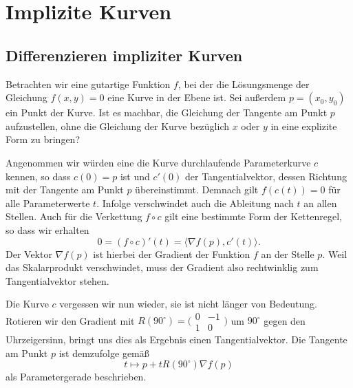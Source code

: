 \section{Implizite Kurven}
\subsection{Differenzieren impliziter Kurven}

Betrachten wir eine gutartige Funktion $f$, bei der die Lösungsmenge
der Gleichung $f(x,y)=0$ eine Kurve in der Ebene ist. Sei außerdem
$p=(x_0,y_0)$ ein Punkt der Kurve. Ist es machbar, die Gleichung
der Tangente am Punkt $p$ aufzustellen, ohne die Gleichung der Kurve
bezüglich $x$ oder $y$ in eine explizite Form zu bringen?

Angenommen wir würden eine die Kurve durchlaufende Parameterkurve
$c$ kennen, so dass $c(0)=p$ ist und $c'(0)$ der Tangentialvektor,
dessen Richtung mit der Tangente am Punkt $p$ übereinstimmt.
Demnach gilt $f(c(t))=0$ für alle Parameterwerte $t$. Infolge
verschwindet auch die Ableitung nach $t$ an allen Stellen. Auch
für die Verkettung $f\circ c$ gilt eine bestimmte Form der
Kettenregel, so dass wir erhalten%
\[0 = (f\circ c)'(t) = \langle\nabla f(p), c'(t)\rangle.\]
Der Vektor $\nabla f(p)$ ist hierbei der Gradient der Funktion
$f$ an der Stelle $p$. Weil das Skalarprodukt verschwindet,
muss der Gradient also rechtwinklig zum Tangentialvektor stehen.

Die Kurve $c$ vergessen wir nun wieder, sie ist nicht länger
von Bedeutung. Rotieren wir den Gradient mit
$R(90^\circ)=\big(\begin{smallmatrix}0 & -1\\ 1 & 0\end{smallmatrix}\big)$
um $90^\circ$ gegen den Uhrzeigersinn, bringt uns dies als
Ergebnis einen Tangentialvektor. Die Tangente am Punkt $p$ ist
demzufolge gemäß%
\[t\mapsto p + tR(90^\circ)\nabla f(p)\]
als Parametergerade beschrieben.

